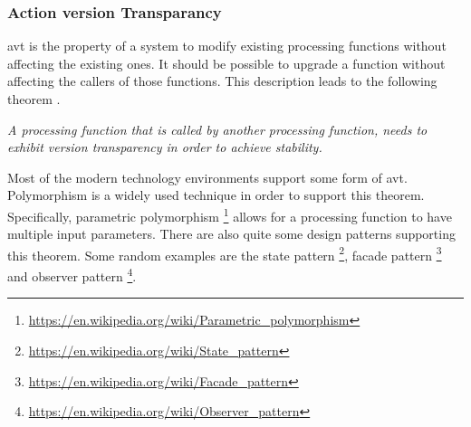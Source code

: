 \subsubsection*{Action version Transparancy}
\gls{avt} is the property of a system to modify existing processing functions without
affecting the existing ones. It should be possible to upgrade a function without affecting
the callers of those functions. This description leads to the following theorem
\parencite[282]{mannaert_normalized_2016}.

\begin{tcolorbox}[boxrule=0.1pt, colback=mygray, title=Theorem III,colbacktitle=gray]
    \textit{A processing function that is called by another processing function, needs to exhibit version transparency in order to achieve stability.}
\end{tcolorbox}

Most of the modern technology environments support some form of \gls{avt}. Polymorphism is
a widely used technique in order to support this theorem. Specifically, parametric
polymorphism \footnote{\url{https://en.wikipedia.org/wiki/Parametric_polymorphism}} allows
for a processing function to have multiple input parameters. There are also quite some
design patterns supporting this theorem. Some random examples are the state pattern
\footnote{\url{https://en.wikipedia.org/wiki/State_pattern}}, facade pattern
\footnote{\url{https://en.wikipedia.org/wiki/Facade_pattern}} and observer pattern
\footnote{\url{https://en.wikipedia.org/wiki/Observer_pattern}}.